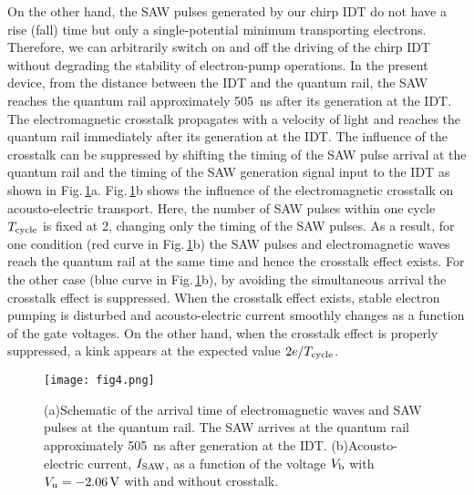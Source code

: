 \documentclass{article}
\begin{document}
On the other hand, the SAW pulses generated by our chirp IDT do not have a rise (fall) time but only a single-potential minimum transporting electrons.
Therefore, we can arbitrarily switch on and off the driving of the chirp IDT without degrading the stability of electron-pump operations.
In the present device, from the distance between the IDT and the quantum rail, the SAW reaches the quantum rail approximately \SI{505}{ns} after its generation at the IDT.
The electromagnetic crosstalk propagates with a velocity of light and reaches the quantum rail immediately after its generation at the IDT.
The influence of the crosstalk can be suppressed by shifting the timing of the SAW pulse arrival at the quantum rail and the timing of the SAW generation signal input to the IDT as shown in Fig.\,\ref{fig:Figure4}a. Fig.\,\ref{fig:Figure4}b shows the influence of the electromagnetic crosstalk on acousto-electric transport.
Here, the number of SAW pulses within one cycle $T_{\rm cycle}$ is fixed at 2, changing only the timing of the SAW pulses. As a result, for one condition (red curve in Fig.\,\ref{fig:Figure4}b) the SAW pulses and electromagnetic waves reach the quantum rail at the same time and hence the crosstalk effect exists.
For the other case (blue curve in Fig.\,\ref{fig:Figure4}b), by avoiding the simultaneous arrival the crosstalk effect is suppressed. When the crosstalk effect exists, stable electron pumping is disturbed and acousto-electric current smoothly changes as a function of the gate voltages.
On the other hand, when the crosstalk effect is properly suppressed, a kink appears at the expected value $2e/T_{\rm cycle}$.

\begin{figure}
\centering
\texttt{[image: fig4.png]}
\caption{\label{fig:Figure4}(a)Schematic of the arrival time of electromagnetic waves and SAW pulses at the quantum rail. The SAW arrives at the quantum rail approximately \SI{505}{ns} after generation at the IDT. (b)Acousto-electric current, $I_{\rm SAW}$, as a function of the voltage $V_{\rm b}$ with $V_{\rm u}=\SI{-2.06}{V}$ with and without crosstalk.}
\end{figure}
\end{document}
